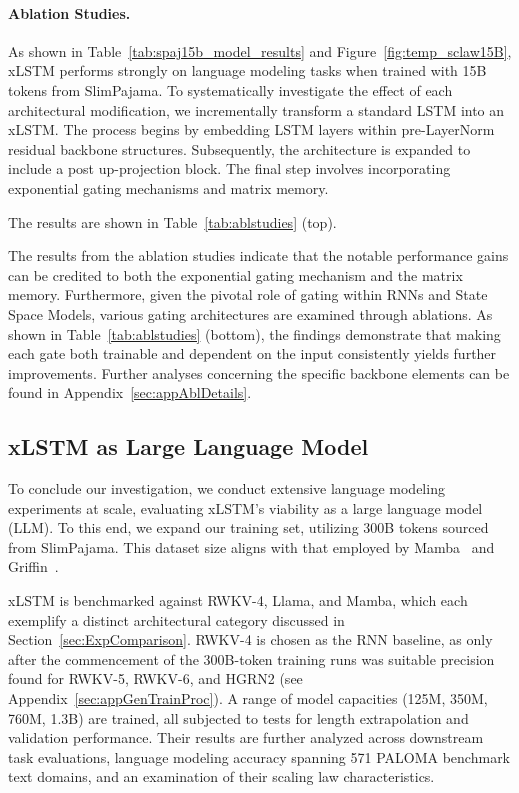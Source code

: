 \paragraph{Ablation Studies.}
As shown in Table~\ref{tab:spaj15b_model_results} and Figure~\ref{fig:temp_sclaw15B}, xLSTM performs strongly on language modeling tasks when trained with 15B tokens from SlimPajama. To systematically investigate the effect of each architectural modification, we incrementally transform a standard LSTM into an xLSTM. The process begins by embedding LSTM layers within pre-LayerNorm residual backbone structures. Subsequently, the architecture is expanded to include a post up-projection block. The final step involves incorporating exponential gating mechanisms and matrix memory.

The results are shown in Table~\ref{tab:ablstudies} (top). 

The results from the ablation studies indicate that the notable performance gains can be credited to both the exponential gating mechanism and the matrix memory. Furthermore, given the pivotal role of gating within RNNs and State Space Models, various gating architectures are examined through ablations. As shown in Table~\ref{tab:ablstudies} (bottom), the findings demonstrate that making each gate both trainable and dependent on the input consistently yields further improvements. Further analyses concerning the specific backbone elements can be found in Appendix~\ref{sec:appAblDetails}.

\subsection{xLSTM as Large Language Model}
\label{sec:ExpLanguage}

To conclude our investigation, we conduct extensive language modeling experiments at scale, evaluating xLSTM's viability as a large language model (LLM). To this end, we expand our training set, utilizing 300B tokens sourced from SlimPajama. This dataset size aligns with that employed by Mamba~\citep{Gu:24arxiv} and Griffin~\citep{De:24arxiv}.

xLSTM is benchmarked against RWKV-4, Llama, and Mamba, which each exemplify a distinct architectural category discussed in Section~\ref{sec:ExpComparison}. RWKV-4 is chosen as the RNN baseline, as only after the commencement of the 300B-token training runs was suitable precision found for RWKV-5, RWKV-6, and HGRN2 (see Appendix~\ref{sec:appGenTrainProc}).
A range of model capacities (125M, 350M, 760M, 1.3B) are trained, all subjected to tests for length extrapolation and validation performance. Their results are further analyzed across downstream task evaluations, language modeling accuracy spanning 571 PALOMA benchmark text domains, and an examination of their scaling law characteristics.

